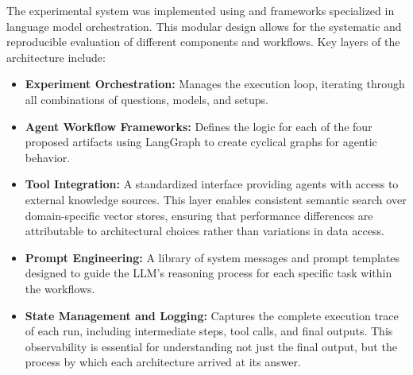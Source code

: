     The experimental system was implemented using \citet{Langchain2025} and \citet{Langgraph2025} frameworks specialized in language model orchestration. This modular design allows for the systematic and reproducible evaluation of different components and workflows. Key layers of the architecture include:

    \begin{itemize}
        \item \textbf{Experiment Orchestration:} Manages the execution loop, iterating through all combinations of questions, models, and setups.
        \item \textbf{Agent Workflow Frameworks:} Defines the logic for each of the four proposed artifacts using LangGraph to create cyclical graphs for agentic behavior.
        \item \textbf{Tool Integration:} A standardized interface providing agents with access to external knowledge sources. This layer enables consistent semantic search over domain-specific vector stores, ensuring that performance differences are attributable to architectural choices rather than variations in data access.
        \item \textbf{Prompt Engineering:} A library of system messages and prompt templates designed to guide the LLM's reasoning process for each specific task within the workflows.
        \item \textbf{State Management and Logging:} Captures the complete execution trace of each run, including intermediate steps, tool calls, and final outputs. This observability is essential for understanding not just the final output, but the process by which each architecture arrived at its answer.
    \end{itemize}




